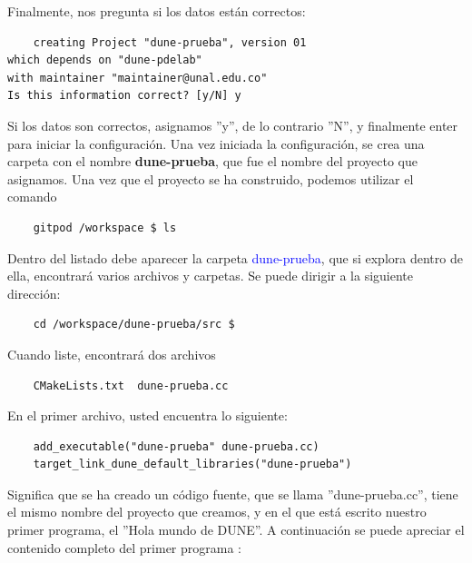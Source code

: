 Finalmente, nos pregunta si los datos están correctos:
\begin{verbatim}
	creating Project "dune-prueba", version 01 
which depends on "dune-pdelab"
with maintainer "maintainer@unal.edu.co"
Is this information correct? [y/N] y
\end{verbatim}
Si los datos son correctos, asignamos ''y'', de lo contrario ''N'', y finalmente enter para iniciar la configuración. Una vez iniciada la configuración,
se crea una carpeta con el nombre \textbf{dune-prueba}, que fue el nombre del proyecto que asignamos.  Una vez que 
el proyecto se ha construido, podemos utilizar el comando \begin{verbatim}
	gitpod /workspace $ ls
\end{verbatim}
Dentro del listado debe aparecer la carpeta \textcolor{blue}{dune-prueba}, que si explora dentro de ella, encontrará 
varios archivos y carpetas.  Se puede dirigir a la siguiente dirección: {\begin{verbatim}
	cd /workspace/dune-prueba/src $ 
\end{verbatim}}Cuando liste, encontrará dos archivos \begin{verbatim}
	CMakeLists.txt  dune-prueba.cc
\end{verbatim}
En el primer archivo, usted encuentra lo siguiente:
\begin{verbatim}
	add_executable("dune-prueba" dune-prueba.cc)
	target_link_dune_default_libraries("dune-prueba")

\end{verbatim} 
Significa que se ha creado un código fuente, que se llama ''dune-prueba.cc'', tiene el mismo nombre del proyecto que 
creamos, y en el que está escrito nuestro primer programa, el ''Hola mundo de DUNE''.  A continuación se puede apreciar 
el contenido completo del primer programa :

\begin{listing}
	\inputminted{cpp}{../../src/dune-learn.cc}
\end{listing}

\immediate{}